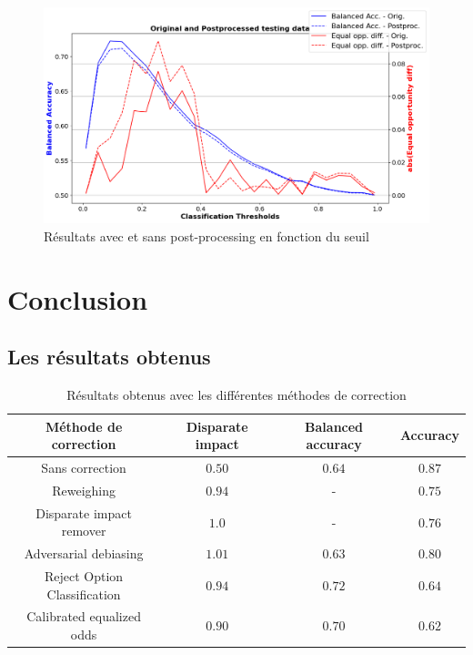 \documentclass{article}
\begin{document}
    \begin{figure}[h]
        \centering
        \includegraphics[width=\textwidth]{./img/cal_equ_odds.png}
        \caption{Résultats avec et sans post-processing en fonction du seuil}
        \label{fig:EQU_odds}
    \end{figure}
    \vspace{3cm}

    \newpage
    \section{Conclusion}

    \subsection{Les résultats obtenus}
    \begin{center}
        \begin{table}[h]
            \begin{tabular}{ |c c c c| }
                \hline
                \textbf{Méthode de correction} & \textbf{Disparate impact} & \textbf{Balanced accuracy} & \textbf{Accuracy} \\
                \hline
                Sans correction & $0.50$ & $0.64$ & $0.87$ \\
                \hline
                Reweighing & $0.94$ & - & $0.75$ \\
                \hline
                Disparate impact remover & $1.0$ & - & $0.76$ \\
                \hline
                Adversarial debiasing & $1.01$ & $0.63$ & $0.80$ \\
                \hline
                Reject Option Classification & $0.94$ & $0.72$ & $0.64$ \\
                \hline
                Calibrated equalized odds & $0.90$ & $0.70$ & $0.62$ \\
                \hline
            \end{tabular}
            \caption{Résultats obtenus avec les différentes méthodes de correction}
            \label{tab:results}
        \end{table}
        
    \end{center}
\end{document}
